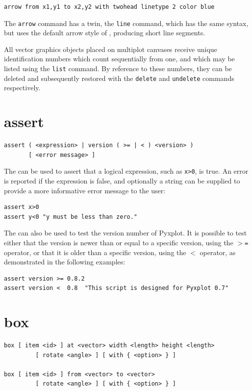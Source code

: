 \begin{verbatim}
arrow from x1,y1 to x2,y2 with twohead linetype 2 color blue
\end{verbatim}

The {\tt arrow} command has a twin, the {\tt line} command, which has the same
syntax, but uses the default arrow style of , producing short
line segments.

All vector graphics objects placed on multiplot canvases receive unique
identification numbers which count sequentially from one, and which may be
listed using the {\tt list} command.  By reference to these numbers, they can
be deleted and subsequently restored with the {\tt delete} and {\tt undelete}
commands respectively.


\section{assert}

\begin{verbatim}
assert ( <expression> | version ( >= | < ) <version> )
       [ <error message> ]
\end{verbatim}

The  can be used to assert that a logical expression, such as
{\tt x>0}, is true. An error is reported if the expression is false, and
optionally a string can be supplied to provide a more informative error message 
to the user:

\begin{verbatim}
assert x>0
assert y<0 "y must be less than zero."
\end{verbatim}

The  can also be used to test the version number of Pyxplot. It
is possible to test either that the version is newer than or equal to a
specific version, using the {\tt $>$=} operator, or that it is older than a
specific version, using the {\tt $<$} operator, as demonstrated in the
following examples:

\begin{verbatim}
assert version >= 0.8.2
assert version <  0.8  "This script is designed for Pyxplot 0.7"
\end{verbatim}


\section{box}

\begin{verbatim}
box [ item <id> ] at <vector> width <length> height <length>
         [ rotate <angle> ] [ with { <option> } ]

box [ item <id> ] from <vector> to <vector>
         [ rotate <angle> ] [ with { <option> } ]
\end{verbatim}

